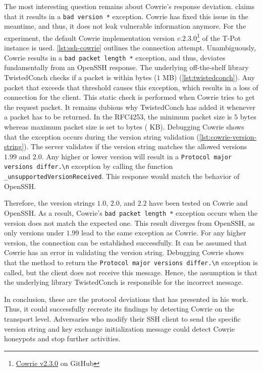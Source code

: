 The most interesting question remains about Cowrie's response deviation.
\citet{vetterl2020} claims that it results in a \verb|bad version *| exception.
Cowrie has fixed this issue in the meantime, and thus, it does not leak vulnerable information anymore.
For the experiment, the default Cowrie implementation version $v.2.3.0$\footnote{\href{https://github.com/cowrie/cowrie/commit/555ff10d95f6239d9d6efee8a2d05def316ab144}{Cowrie v2.3.0} on GitHub} of the T-Pot instance is used.
\autoref{lst:ssh-cowrie} outlines the connection attempt.
Unambiguously, Cowrie results in a \verb|bad packet length *| exception, and thus, deviates fundamentally from an Open\-SSH response.
The underlying off-the-shelf library TwistedConch checks if a packet is within  bytes ($1$ MB) (\autoref{lst:twistedconch}).
Any packet that exceeds that threshold causes this exception, which results in a loss of connection for the client.
This static check is performed when Cowrie tries to get the request packet.
It remains dubious why TwistedConch has added it whenever a packet has to be returned.
In the RFC4253, the minimum packet size is $5$ bytes whereas maximum packet size is set to  bytes ( KB).
Debugging Cowrie shows that the exception occurs during the version string validation (\autoref{lst:cowrie-version-string}).
The server validates if the version string matches the allowed versions $1.99$ and $2.0$.
Any higher or lower version will result in a \verb|Protocol major versions differ.\n| exception by calling the function \verb|_unsupportedVersionReceived|.
This response would match the behavior of OpenSSH.

Therefore, the version strings $1.0$, $2.0$, and $2.2$ have been tested on Cowrie and OpenSSH.
As a result, Cowrie's \verb|bad packet length *| exception occurs when the version does not match the expected one.
This result diverges from OpenSSH, as only versions under $1.99$ lead to the same exception as Cowrie.
For any higher version, the connection can be established successfully.
It can be assumed that Cowrie has an error in validating the version string.
Debugging Cowrie shows that the method to return the \verb|Protocol major versions differ.\n| exception is called, but the client does not receive this message.
Hence, the assumption is that the underlying library TwistedConch is responsible for the incorrect message.

In conclusion, these are the protocol deviations that \citet{vetterl2020} has presented in his work.
Thus, it could successfully recreate its findings by detecting Cowrie on the transport level.
Adversaries who modify their SSH client to send the specific version string and key exchange initialization message could detect Cowrie honeypots and stop further activities.

